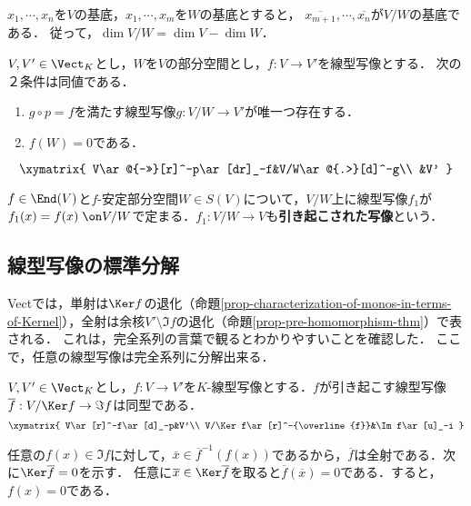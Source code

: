 \documentclass[uplatex, dvipdfmx]{jsreport}
\begin{document}
\begin{corollary}
    $x_1,\cdots,x_n$を$V$の基底，$x_1,\cdots,x_m$を$W$の基底とすると，
    $\overline{x_{m+1}},\cdots,\overline{x_n}$が$V/W$の基底である．
    従って，$\dim V/W=\dim V-\dim W$．
\end{corollary}


\begin{proposition}[商空間の普遍性]\label{prop-universality-of-quotient-spaces}
    $V,V'\in\Vect_K$とし，$W$を$V$の部分空間とし，$f:V\to V'$を線型写像とする．
    次の２条件は同値である．
    \begin{enumerate}
        \item $g\circ p=f$を満たす線型写像$g:V/W\to V'$が唯一つ存在する．
        \item $f(W)=0$である．
    \end{enumerate}
    \[\xymatrix{
        V\ar@{->>}[r]^-p\ar[dr]_-f&V/W\ar@{.>}[d]^-g\\
        &V'
    }\]
\end{proposition}
\begin{remarks}
    $f\in\End(V)$と$f$-安定部分空間$W\in S(V)$について，$V/W$上に線型写像$f_1$が$f_1(x)=f(x)\;\on V/W$で定まる．$f_1:V/W\to V$も\textbf{引き起こされた写像}という．
\end{remarks}

\subsection{線型写像の標準分解}

\begin{tcolorbox}[colframe=ForestGreen, colback=ForestGreen!10!white,breakable,colbacktitle=ForestGreen!40!white,coltitle=black,fonttitle=\bfseries\sffamily,
title=線型写像の準同型定理は，任意の線型写像を完全系列に分解する]
    Vectでは，単射は$\Ker f$の退化（命題\ref{prop-characterization-of-monos-in-terms-of-Kernel}），全射は余核$V'\setminus\Im f$の退化（命題\ref{prop-pre-homomorphism-thm}）で表される．
    これは，完全系列の言葉で観るとわかりやすいことを確認した．
    ここで，任意の線型写像は完全系列に分解出来る．
\end{tcolorbox}

\begin{proposition}\label{prop-homomorphism-thm}
    $V,V'\in\Vect_K$とし，$f:V\to V'$を$K$-線型写像とする．$f$が引き起こす線型写像$\overline{f}:V/\Ker f\to\Im f$は同型である．
    \[\xymatrix{
        V\ar[r]^-f\ar[d]_-p&V'\\
        V/\Ker f\ar[r]^-{\overline{f}}&\Im f\ar[u]_-i
    }\]
\end{proposition}
\begin{Proof}
    任意の$f(x)\in\Im f$に対して，$\overline{x}\in\overline{f}^{-1}(f(x))$であるから，$\overline{f}$は全射である．次に$\Ker\overline{f}=0$を示す．
    任意に$\overline{x}\in\Ker\overline{f}$を取ると$\overline{f}(\overline{x})=0$である．すると，$f(x)=0$である．
\end{Proof}
\end{document}
